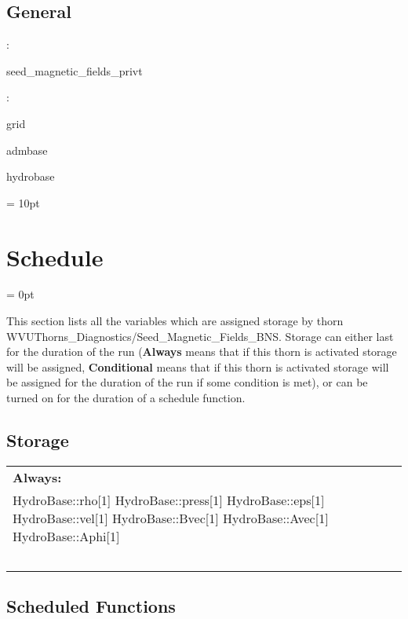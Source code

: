\vspace{3mm} \subsection*{General}

: 

seed\_magnetic\_fields\_privt
\vspace{2mm}

: 

grid

admbase

hydrobase
\vspace{2mm}

\vspace{5mm}\parskip = 10pt 

\section{Schedule} 


\parskip = 0pt


\noindent This section lists all the variables which are assigned storage by thorn WVUThorns\_Diagnostics/Seed\_Magnetic\_Fields\_BNS.  Storage can either last for the duration of the run ({\bf Always} means that if this thorn is activated storage will be assigned, {\bf Conditional} means that if this thorn is activated storage will be assigned for the duration of the run if some condition is met), or can be turned on for the duration of a schedule function.


\subsection*{Storage}

\hspace{5mm}

 \begin{tabular*}{160mm}{ll} 

{\bf Always:}&  ~ \\ 
 HydroBase::rho[1] HydroBase::press[1] HydroBase::eps[1] HydroBase::vel[1] HydroBase::Bvec[1] HydroBase::Avec[1] HydroBase::Aphi[1] & ~\\ 
~ & ~\\ 
\end{tabular*} 


\subsection*{Scheduled Functions}
\vspace{5mm}

